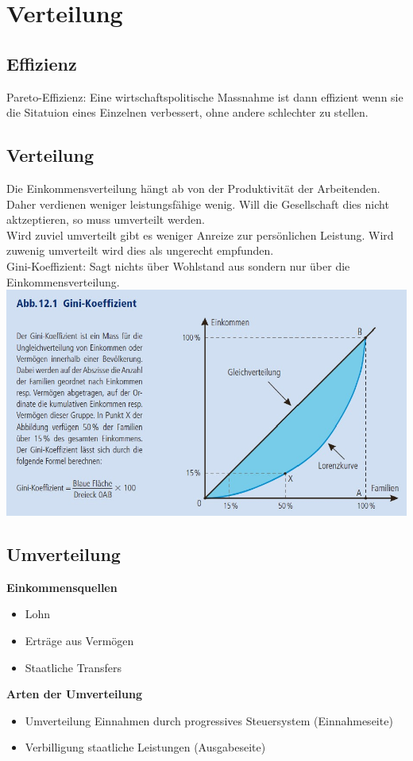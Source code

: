 \section{Verteilung}
\subsection{Effizienz}
Pareto-Effizienz: Eine wirtschaftspolitische Massnahme ist dann effizient wenn sie die Sitatuion eines Einzelnen verbessert, ohne andere schlechter zu stellen. 
\subsection{Verteilung}
Die Einkommensverteilung hängt ab von der Produktivität der Arbeitenden. Daher verdienen weniger leistungsfähige wenig. Will die Gesellschaft dies nicht aktzeptieren, so muss umverteilt werden.\\
Wird zuviel umverteilt gibt es weniger Anreize zur persönlichen Leistung. Wird zuwenig umverteilt wird dies als ungerecht empfunden.\\
Gini-Koeffizient: Sagt nichts über Wohlstand aus sondern nur über die Einkommensverteilung.\\
\includegraphics[width=0.8\linewidth]{images/gini.jpg}
\subsection{Umverteilung} 
\begin{multicols}{2}
\textbf{Einkommensquellen}
\begin{itemize}
	\item Lohn
	\item Erträge aus Vermögen
	\item Staatliche Transfers
\end{itemize}
\columnbreak
\textbf{Arten der Umverteilung}
\begin{itemize}
	\item Umverteilung Einnahmen durch progressives Steuersystem (Einnahmeseite)
	\item Verbilligung staatliche Leistungen (Ausgabeseite)
\end{itemize}
\end{multicols}
